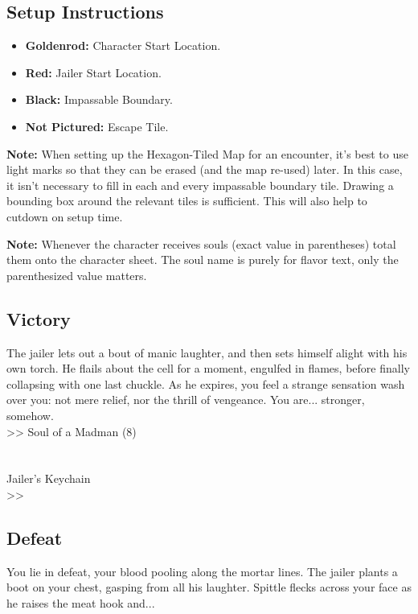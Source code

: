 \subsection*{Setup Instructions}
\begin{itemize}
\item \textbf{Goldenrod:} Character Start Location.
\item \textbf{Red:} Jailer Start Location.
\item \textbf{Black:} Impassable Boundary.
\item \textbf{Not Pictured:} Escape Tile.
\end{itemize}

\begin{tcolorbox}
\textbf{Note:} When setting up the Hexagon-Tiled Map for an encounter, it’s best to use light marks so that they can be erased (and the map re-used) later. In this case, it isn’t necessary to fill in each and every impassable boundary tile. Drawing a bounding box around the relevant tiles is sufficient. This will also help to cutdown on setup time.
\end{tcolorbox}

\pagebreak

\begin{tcolorbox}
\textbf{Note:} Whenever the character receives souls (exact value in parentheses) total them onto the character sheet. The soul name is purely for flavor text, only the parenthesized value matters.
\end{tcolorbox}

\subsection*{Victory}
The jailer lets out a bout of manic laughter, and then sets himself alight with his own torch. He flails about the cell for a moment, engulfed in flames, before finally collapsing with one last chuckle. As he expires, you feel a strange sensation wash over you: not mere relief, nor the thrill of vengeance. You are... stronger, somehow.\\
>> Soul of a Madman (8)\\
\\
\\
 Jailer’s Keychain\\
>> 

\subsection*{Defeat}
You lie in defeat, your blood pooling along the mortar lines. The jailer plants a boot on your chest, gasping from all his laughter. Spittle flecks across your face as he raises the meat hook and...\\

